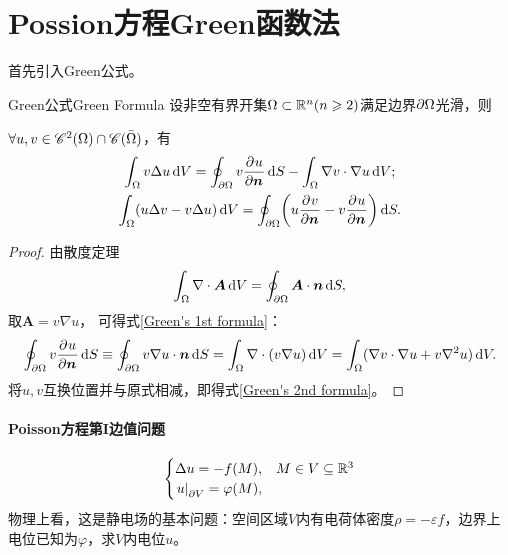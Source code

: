 \section{Possion方程Green函数法}
首先引入Green公式。
\begin{theorem}{Green公式}{Green Formula}
	设非空有界开集$\Omega\subset\mathbb R^n(n\geqslant 2)$满足边界$\partial\Omega$光滑，则
	
	$\forall u,v\in\mathscr C^2(\Omega)\cap\mathscr C(\bar\Omega)$，有
	\begin{gather}
		\label{Green's 1st formula}
		\int_\Omega v\Delta u\mathop{}\!\mathrm{d} V=\oint_{\partial\Omega}v\frac{\partial^{{}}u}{\partial{\bm n}^{{}}}\mathop{}\!\mathrm{d} S-\int_\Omega\nabla v\cdot\nabla u\mathop{}\!\mathrm{d} V;\\
		\label{Green's 2nd formula}
		\int_\Omega(u\Delta v-v\Delta u)\mathop{}\!\mathrm{d} V=\oint_{\partial\Omega}\biggl(u\frac{\partial^{{}}v}{\partial{\bm n}^{{}}}-v\frac{\partial^{{}}u}{\partial{\bm n}^{{}}}\biggr)\mathop{}\!\mathrm{d} S.
	\end{gather}
\end{theorem}
\begin{proof}
	由散度定理
	\begin{align}
		\int_\Omega\nabla\cdot\bm A\mathop{}\!\mathrm{d} V=\oint_{\partial\Omega}\bm A\cdot\bm n\mathop{}\!\mathrm{d} S,
	\end{align}
	取$\bm A=v\nabla u$，
	可得式\eqref{Green's 1st formula}：
	\[
		\oint_{\partial\Omega}v\frac{\partial^{{}}u}{\partial{\bm n}^{{}}}\mathop{}\!\mathrm{d} S\equiv\oint_{\partial\Omega}v\nabla u\cdot\bm n\mathop{}\!\mathrm{d} S=\int_\Omega\nabla\cdot(v\nabla u)\mathop{}\!\mathrm{d} V=\int_\Omega(\nabla v\cdot\nabla u+v\nabla^2u)\mathop{}\!\mathrm{d} V.
	\]
	将$u,v$互换位置并与原式相减，即得式\eqref{Green's 2nd formula}。
\end{proof}
\paragraph{Poisson方程第I边值问题}
\begin{align}
	\begin{cases}
		\Delta u=-f(M),&M\in V\subseteq\mathbb R^3\\
		\left.u\right\rvert_{\partial V}=\varphi(M),
	\end{cases}
\end{align}
物理上看，这是静电场的基本问题：空间区域$V$内有电荷体密度$\rho=-\varepsilon f$，边界上电位已知为$\varphi$，求$V$内电位$u$。


